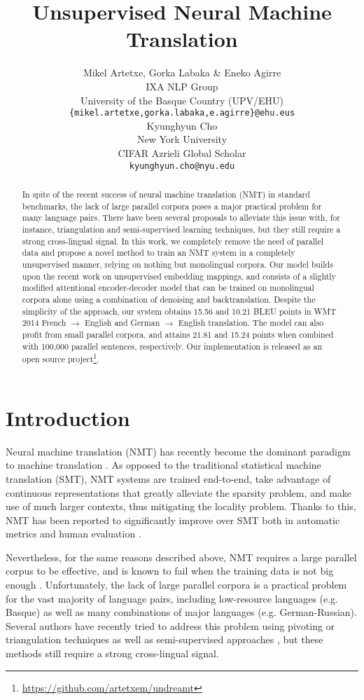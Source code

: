 \documentclass{article} \usepackage{iclr2018_conference,times}
\title{Unsupervised Neural Machine Translation}
\author{Mikel Artetxe, Gorka Labaka \& Eneko Agirre \\
IXA NLP Group\\
University of the Basque Country (UPV/EHU) \\
\texttt{\{mikel.artetxe,gorka.labaka,e.agirre\}@ehu.eus} \\
\And
Kyunghyun Cho \\
New York University \\
CIFAR Azrieli Global Scholar \\
\texttt{kyunghyun.cho@nyu.edu}
}
\begin{document}
\maketitle

\begin{abstract}
In spite of the recent success of neural machine translation (NMT) in standard benchmarks, the lack of large parallel corpora poses a major practical problem for many language pairs. There have been several proposals to alleviate this issue with, for instance, triangulation and semi-supervised learning techniques, but they still require a strong cross-lingual signal. In this work, we completely remove the need of parallel data and propose a novel method to train an NMT system in a completely unsupervised manner, relying on nothing but monolingual corpora. Our model builds upon the recent work on unsupervised embedding mappings, and consists of a slightly modified attentional encoder-decoder model that can be trained on monolingual corpora alone using a combination of denoising and backtranslation. Despite the simplicity of the approach, our system obtains 15.56 and 10.21 BLEU points in WMT 2014 French $\rightarrow$ English and German $\rightarrow$ English translation. The model can also profit from small parallel corpora, and attains 21.81 and 15.24 points when combined with 100,000 parallel sentences, respectively. Our implementation is released as an open source project\footnote{\url{https://github.com/artetxem/undreamt}}.
\end{abstract}

\section{Introduction}

Neural machine translation (NMT) has recently become the dominant paradigm to machine translation \citep{bahdanau2014neural,sutskever2014sequence}. As opposed to the traditional statistical machine translation (SMT), NMT systems are trained end-to-end, take advantage of continuous representations that greatly alleviate the sparsity problem, and make use of much larger contexts, thus mitigating the locality problem. Thanks to this, NMT has been reported to significantly improve over SMT both in automatic metrics and human evaluation \citep{wu2016google}.

Nevertheless, for the same reasons described above, NMT requires a large parallel corpus to be effective, and is known to fail when the training data is not big enough \citep{koehn2017six}. Unfortunately, the lack of large parallel corpora is a practical problem for the vast majority of language pairs, including low-resource languages (e.g. Basque) as well as many combinations of major languages (e.g. German-Russian). Several authors have recently tried to address this problem using pivoting or triangulation techniques \citep{che2017teacher} as well as semi-supervised approaches \citep{he2016dual}, but these methods still require a strong cross-lingual signal.
\end{document}
